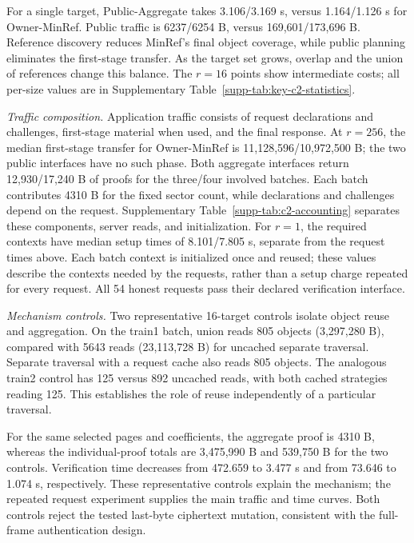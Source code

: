 \documentclass[10pt,journal]{IEEEtran}
\begin{document}
For a single target, Public-Aggregate takes 3.106/3.169 s, versus
1.164/1.126 s for Owner-MinRef. Public traffic is 6237/6254 B,
versus 169,601/173,696 B. Reference discovery reduces MinRef's final
object coverage, while public planning eliminates the first-stage transfer.
As the target set grows, overlap and the union of references change this
balance. The $r=16$ points show intermediate costs; all per-size values are
in Supplementary Table~\ref*{supp-tab:key-c2-statistics}.

\emph{Traffic composition.}
Application traffic consists of request declarations and challenges,
first-stage material when used, and the final response. At $r=256$, the
median first-stage transfer for Owner-MinRef is 11,128,596/10,972,500 B;
the two public interfaces have no such phase. Both aggregate interfaces
return 12,930/17,240 B of proofs for the three/four involved batches.
Each batch contributes 4310 B for the fixed sector count, while declarations
and challenges depend on the request. Supplementary
Table~\ref*{supp-tab:c2-accounting} separates these components, server reads,
and initialization. For $r=1$, the required contexts have median setup times
of 8.101/7.805 s, separate from the request times above. Each batch context is
initialized once and reused; these values describe the contexts needed by
the requests, rather than a setup charge repeated for every request. All 54
honest requests pass their declared verification interface.

\emph{Mechanism controls.}
Two representative 16-target controls isolate object reuse and aggregation.
On the train1 batch, union reads 805 objects (3,297,280 B), compared with
5643 reads (23,113,728 B) for uncached separate traversal. Separate traversal
with a request cache also reads 805 objects. The analogous train2 control
has 125 versus 892 uncached reads, with both cached strategies reading 125.
This establishes the role of reuse independently of a particular traversal.

For the same selected pages and coefficients, the aggregate proof is 4310 B,
whereas the individual-proof totals are 3,475,990 B and 539,750 B for the
two controls. Verification time decreases from 472.659 to 3.477 s and
from 73.646 to 1.074 s, respectively. These representative controls explain
the mechanism; the repeated request experiment supplies the main traffic
and time curves. Both controls reject the tested last-byte ciphertext
mutation, consistent with the full-frame authentication design.
\end{document}

